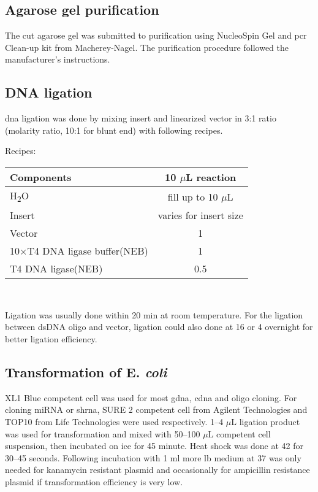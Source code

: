 \subsection{Agarose gel purification}
The cut agarose gel was submitted to purification using NucleoSpin\textsuperscript{\textregistered} Gel and \gls{pcr} Clean-up kit from Macherey-Nagel. The purification procedure followed the manufacturer's instructions. 

\subsection{DNA ligation}
\gls{dna} ligation was done by mixing insert and linearized vector in 3:1 ratio (molarity ratio, 10:1 for blunt end) with following recipes.

Recipes:

\begin{center}
	\begin{tabular}{l | c}
	Components                        & 10 $\mu$L reaction\\
	\hline
	H\textsubscript{2}O               & fill up to 10 $\mu$L\\
	Insert                            & varies for insert size\\
	Vector                            & 1\\
	10$\times$T4 DNA ligase buffer(NEB)     & 1\\
	T4 DNA ligase(NEB)                & 0.5\\
	\end{tabular}\\
\end{center}

Ligation was usually done within 20 min at room temperature. For the ligation between dsDNA oligo and vector, ligation could also done at 16{\celsius} or 4{\celsius} overnight for better ligation efficiency.

\subsection{Transformation of E. \textit{coli}}
XL1 Blue competent cell was used for most \gls{gdna}, \gls{cdna} and oligo cloning. For cloning miRNA or \gls{shrna}, SURE 2 competent cell from Agilent Technologies and TOP10 from Life Technologies were used respectively. 1--4 $\mu$L ligation product was used for transformation and mixed with 50--100 $\mu$L competent cell suspension, then incubated on ice for 45 minute. Heat shock was done at 42{\celsius} for 30--45 seconds. Following incubation with 1 ml more \gls{lb} medium at 37{\celsius} was only needed for kanamycin resistant plasmid and occasionally for ampicillin resistance plasmid if transformation efficiency is very low. 

